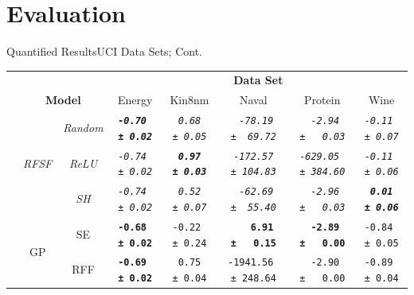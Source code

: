 \documentclass[
	USenglish,
	aspectratio=43,
	color={accentcolor=1c},
	logo=true,
	colorframetitle=true,
	hyperref={pdfpagelabels=true},
]{tudabeamer}
\newcommand{\acs}[1]{#1}
\begin{document}
	\section{Evaluation}
		\begin{frame}{Quantified Results}{UCI Data Sets; Cont.}
			\begin{center}
				\tiny
				\begin{tabular}{c|cc|ccccc}
					\toprule
					& & & \multicolumn{5}{c}{\textbf{Data Set}} \\[1pt]
					& \multicolumn{2}{c|}{\textbf{Model}}             & Energy                           & Kin8nm                           & Naval                                 & Protein                              & Wine                             \\
					\midrule \multirow{5}{*}{\rotatebox{90}{\textbf{Log-Lik.}}}
					& \multirow[t]{3}{*}{\textit{\acs{RFSF}}} & \textit{Random}         & \textit{\textbf{\texttt{-0.70\,±\,0.02}}} & \textit{\texttt{~0.68\,±\,0.05}}          & \textit{\texttt{~~-78.19\,±\,~69.72}}          & \textit{\texttt{~~-2.94\,±\,~~0.03}}          & \textit{\texttt{-0.11\,±\,0.07}}          \\
					&                                & \textit{\acs{ReLU}}     & \textit{\texttt{-0.74\,±\,0.02}}          & \textit{\textbf{\texttt{~0.97\,±\,0.03}}} & \textit{\texttt{~-172.57\,±\,104.83}}          & \textit{\texttt{-629.05\,±\,384.60}}          & \textit{\texttt{-0.11\,±\,0.06}}          \\
					&                                & \textit{\acs{SH}}       & \textit{\texttt{-0.74\,±\,0.02}}          & \textit{\texttt{~0.52\,±\,0.07}}          & \textit{\texttt{~~-62.69\,±\,~55.40}}          & \textit{\texttt{~~-2.96\,±\,~~0.03}}          & \textit{\textbf{\texttt{ 0.01\,±\,0.06}}} \\
					& \multirow[t]{2}{*}{\acs{GP}}   & \acs{SE}       & \textbf{\texttt{-0.68\,±\,0.02}} & \texttt{-0.22\,±\,0.24}          & \textbf{\texttt{~~~~6.91\,±\,~~0.15}} & \textbf{\texttt{~~-2.89\,±\,~~0.00}} & \texttt{-0.84\,±\,0.05}          \\
					&                                & \acs{RFF}      & \textbf{\texttt{-0.69\,±\,0.02}} & \texttt{~0.75\,±\,0.04}          & \texttt{-1941.56\,±\,248.64}          & \texttt{~~-2.90\,±\,~~0.00}          & \texttt{-0.89\,±\,0.04}          \\
					\bottomrule
				\end{tabular}
			\end{center}
		\end{frame}
\end{document}
